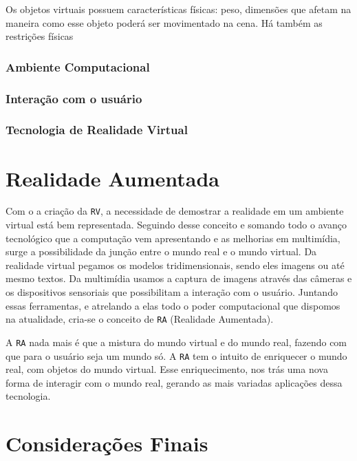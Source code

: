 Os objetos virtuais possuem características físicas: peso, dimensões que afetam na maneira como esse objeto poderá ser movimentado na cena. Há também as restrições físicas

\subsubsection{Ambiente Computacional}

\subsubsection{Interação com o usuário}

\subsubsection{Tecnologia de Realidade Virtual}

\section {Realidade Aumentada}

Com o a criação da \verb'RV', a necessidade de demostrar a realidade em um ambiente virtual está bem representada. Seguindo desse conceito e somando todo o avanço tecnológico que a computação vem apresentando e as melhorias em multimídia, surge a possibilidade da junção entre o mundo real e o mundo virtual. Da realidade virtual pegamos os modelos tridimensionais, sendo eles imagens ou até mesmo textos. Da multimídia usamos a captura de imagens através das câmeras e os dispositivos sensoriais que possibilitam a interação com o usuário. Juntando essas ferramentas, e atrelando a elas todo o poder computacional que dispomos na atualidade, cria-se o conceito de \verb'RA' (Realidade Aumentada).

A \verb'RA' nada mais é que a mistura do mundo virtual e do mundo real, fazendo com que para o usuário seja um mundo só. A \verb'RA' tem o intuito de enriquecer o mundo real, com objetos do mundo virtual. Esse enriquecimento, nos trás uma nova forma de interagir com o mundo real, gerando as mais variadas aplicações dessa tecnologia.




\section {Considerações Finais}
